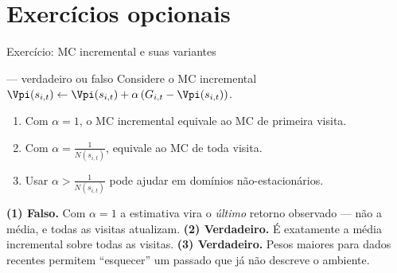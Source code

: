 \documentclass[aspectratio=169, 11pt]{beamer}
\begin{document}
\section*{Exercícios opcionais}
\begin{frame}
\end{frame}

\begin{frame}{Exercício: MC incremental e suas variantes}
  \begin{exbox}{— verdadeiro ou falso}
    Considere o MC incremental
    $\Vpi(s_{i,t}) \leftarrow \Vpi(s_{i,t}) + \alpha\,(G_{i,t} - \Vpi(s_{i,t}))$.
    \begin{enumerate}\setlength{\itemsep}{0.15ex}
      \item Com $\alpha = 1$, o MC incremental equivale ao MC de primeira visita.
      \item Com $\alpha = \tfrac{1}{N(s_{i,t})}$, equivale ao MC de toda visita.
      \item Usar $\alpha > \tfrac{1}{N(s_{i,t})}$ pode ajudar em domínios
        não-estacionários.
    \end{enumerate}
  \end{exbox}

  \pause
  \begin{respbox}
    \textbf{(1) Falso.} Com $\alpha = 1$ a estimativa vira o \emph{último}
    retorno observado — não a média, e todas as visitas atualizam.
    \textbf{(2) Verdadeiro.} É exatamente a média incremental sobre todas
    as visitas.
    \textbf{(3) Verdadeiro.} Pesos maiores para dados recentes permitem
    ``esquecer'' um passado que já não descreve o ambiente.
  \end{respbox}
\end{frame}
\end{document}
